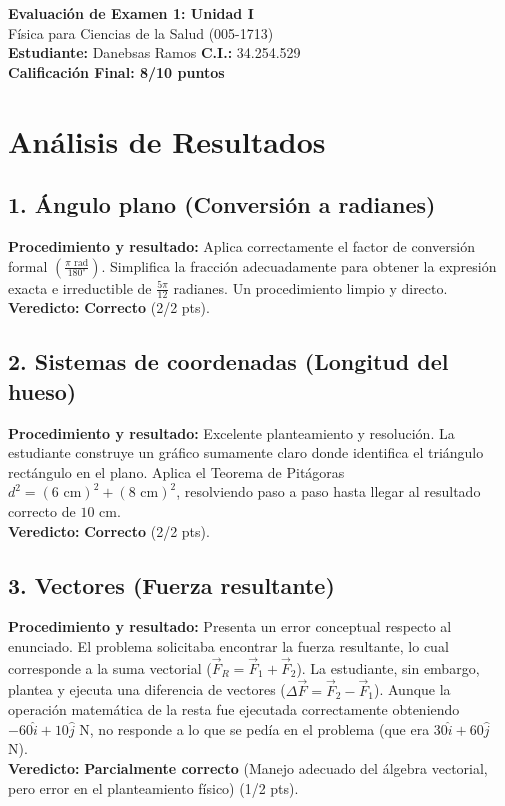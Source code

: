 \documentclass[12pt]{article}
\begin{document}
\begin{center}
    \Large \textbf{Evaluación de Examen 1: Unidad I} \\
    \large Física para Ciencias de la Salud (005-1713) \\
    \vspace{0.5cm}
    \textbf{Estudiante:} Danebsas Ramos \quad \textbf{C.I.:} 34.254.529
    \vspace{0.3cm} \\
    \large \textbf{Calificación Final: 8/10 puntos}
\end{center}

\vspace{0.5cm}

\section*{Análisis de Resultados}

\subsection*{1. Ángulo plano (Conversión a radianes)}
\textbf{Procedimiento y resultado:} Aplica correctamente el factor de conversión formal $\left(\frac{\pi \text{ rad}}{180^\circ}\right)$. Simplifica la fracción adecuadamente para obtener la expresión exacta e irreductible de $\frac{5\pi}{12}$ radianes. Un procedimiento limpio y directo. \\
\textbf{Veredicto:} \textbf{Correcto} (2/2 pts).

\subsection*{2. Sistemas de coordenadas (Longitud del hueso)}
\textbf{Procedimiento y resultado:} Excelente planteamiento y resolución. La estudiante construye un gráfico sumamente claro donde identifica el triángulo rectángulo en el plano. Aplica el Teorema de Pitágoras $d^2 = (6\text{ cm})^2 + (8\text{ cm})^2$, resolviendo paso a paso hasta llegar al resultado correcto de $10\text{ cm}$. \\
\textbf{Veredicto:} \textbf{Correcto} (2/2 pts).

\subsection*{3. Vectores (Fuerza resultante)}
\textbf{Procedimiento y resultado:} Presenta un error conceptual respecto al enunciado. El problema solicitaba encontrar la fuerza resultante, lo cual corresponde a la suma vectorial ($\vec{F}_R = \vec{F}_1 + \vec{F}_2$). La estudiante, sin embargo, plantea y ejecuta una diferencia de vectores ($\Delta\vec{F} = \vec{F}_2 - \vec{F}_1$). Aunque la operación matemática de la resta fue ejecutada correctamente obteniendo $-60\hat{i} + 10\hat{j}$ N, no responde a lo que se pedía en el problema (que era $30\hat{i} + 60\hat{j}$ N). \\
\textbf{Veredicto:} \textbf{Parcialmente correcto} (Manejo adecuado del álgebra vectorial, pero error en el planteamiento físico) (1/2 pts).
\end{document}
